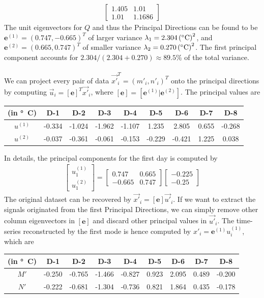 \begin{exmp}
\begin{align*}
\begin{bmatrix}
1.405 & 1.01 \\
1.01 & 1.1686
\end{bmatrix}
\end{align*}
The unit eigenvectors for $Q$ and thus the Principal Directions can be found to be $\textbf{e}^{(1)} = (0.747, -0.665)^T$ of larger variance $\lambda_1 = \SI{2.304}{\square {(\degree C)}}$, and $\textbf{e}^{(2)} = (0.665, 0.747)^T$ of smaller variance $\lambda_2 = \SI{0.270}{\square {(\degree C)}}$. The first principal component accounts for $2.304 / (2.304+0.270) \approx 89.5\%$ of the total variance.\\
\\
We can project every pair of data $\vec{x'}_i^T = (m'_i, n'_i)^T$ onto the principal directions by computing $\vec{u}_i = [\textbf{e}]^T\vec{x'}_i$, where $[\textbf{e}] = [\textbf{e}^{(1)}|\textbf{e}^{(2)}]$. The principal values are 
\begin{center}
\begin{tabular}{|c|c|c|c|c|c|c|c|c|}
\hline
(in \si{\degree C}) & D-1 & D-2 & D-3 & D-4 & D-5 & D-6 & D-7 & D-8 \\
\hline
$u^{(1)}$ & -0.334 & -1.024 & -1.962 & -1.107 & 1.235 & 2.805 & 0.655 & -0.268 \\
\hline
$u^{(2)}$ & -0.037 & -0.361 & -0.061 & -0.153 & -0.229 & -0.421 & 1.225 & 0.038 \\
\hline
\end{tabular}
\end{center}
In details, the principal components for the first day is computed by
\begin{align*}
\begin{bmatrix}
u_1^{(1)} \\
u_1^{(2)} 
\end{bmatrix}
=
\begin{bmatrix}
0.747 & 0.665 \\
-0.665 & 0.747
\end{bmatrix}
\begin{bmatrix}
-0.225 \\
-0.25
\end{bmatrix}
\end{align*}
The original dataset can be recovered by $\vec{x'}_i = [\textbf{e}]\vec{u'}_i$. If we want to extract the signals originated from the first Principal Directions, we can simply remove other column eigenvectors in $[\textbf{e}]$ and discard other principal values in $\vec{u'}_i$. The time-series reconstructed by the first mode is hence computed by $x'_i = \textbf{e}^{(1)}u_i^{(1)}$, which are
\begin{center}
\begin{tabular}{|c|c|c|c|c|c|c|c|c|}
\hline
(in \si{\degree C}) & D-1 & D-2 & D-3 & D-4 & D-5 & D-6 & D-7 & D-8 \\
\hline
$M'$ & -0.250 & -0.765 & -1.466 & -0.827 & 0.923 & 2.095 & 0.489 & -0.200 \\
\hline
$N'$ & -0.222 & -0.681 & -1.304 & -0.736 & 0.821 & 1.864 & 0.435 & -0.178 \\
\hline
\end{tabular}
\end{center}
\end{exmp}
